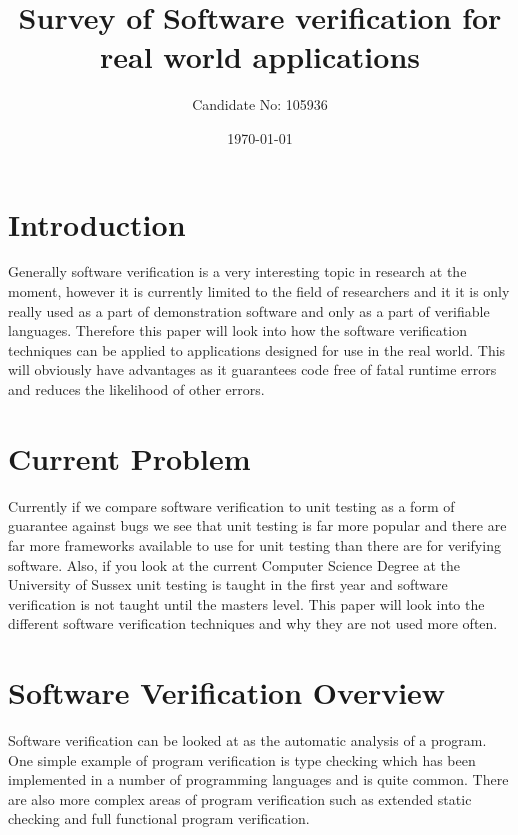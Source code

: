 \documentclass[a4paper,12pt]{scrartcl}
\title{Survey of Software verification for real world applications}
\author{Candidate No: 105936}
\date{\today}
\begin{document}
	
	\begin{titlepage}
		\maketitle
	\end{titlepage}
	
	\tableofcontents
	\newpage
	\section{Introduction}
	{
		Generally software verification is a very interesting topic in research at the moment, however it is currently limited to the field of researchers and it it is only really used as a part of demonstration software and only as a part of verifiable languages. Therefore this paper will look into how the software verification techniques can be applied to applications designed for use in the real world. This will obviously have advantages as it guarantees code free of fatal runtime errors and reduces the likelihood of other errors.
	}

	\section{Current Problem}
	{
		Currently if we compare software verification to unit testing as a form of guarantee against bugs we see that unit testing is far more popular and there are far more frameworks available to use for unit testing than there are for verifying software. Also, if you look at the current Computer Science Degree at the University of Sussex unit testing is taught in the first year and software verification is not taught until the masters level. This paper will look into the different software verification techniques and why they are not used more often.
	}

	\section{Software Verification Overview}
	{
		Software verification can be looked at as the automatic analysis of a program. One simple example of program verification is type checking which has been implemented in a number of programming languages and is quite common. There are also more complex areas of program verification such as extended static checking and full functional program verification.
	}
	
\end{document}
